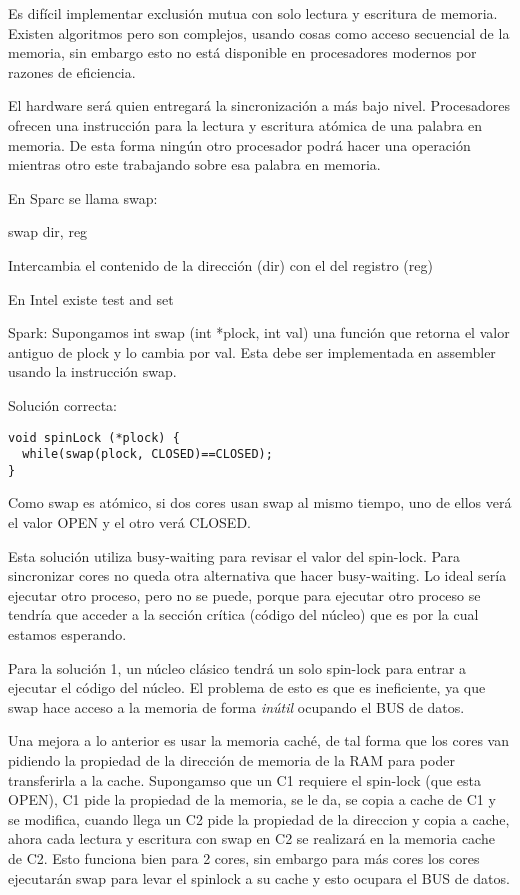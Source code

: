 Es difícil implementar exclusión mutua con solo lectura y escritura de memoria. Existen algoritmos pero son complejos, usando cosas como acceso secuencial de la memoria, sin embargo esto no está disponible en procesadores modernos por razones de eficiencia.

El hardware será quien entregará la sincronización a más bajo nivel. Procesadores ofrecen una instrucción para la lectura y escritura atómica de una palabra en memoria. De esta forma ningún otro procesador podrá hacer una operación mientras otro este trabajando sobre esa palabra en memoria.

En Sparc se llama swap:

swap dir, reg

Intercambia el contenido de la dirección (dir) con el del registro (reg)

En Intel existe test and set


Spark: Supongamos int swap (int *plock, int val) una función que retorna el valor antiguo de plock y lo cambia por val. Esta debe ser implementada en assembler usando la instrucción swap.

Solución correcta:
\begin{verbatim}
void spinLock (*plock) {
  while(swap(plock, CLOSED)==CLOSED);
}
\end{verbatim}

Como swap es atómico, si dos cores usan swap al mismo tiempo, uno de ellos verá el valor OPEN y el otro verá CLOSED.

Esta solución utiliza busy-waiting para revisar el valor del spin-lock. Para sincronizar cores no queda otra alternativa que hacer busy-waiting. Lo ideal sería ejecutar otro proceso, pero no se puede, porque para ejecutar otro proceso se tendría que acceder a la sección crítica (código del núcleo) que es por la cual estamos esperando.

Para la solución 1, un núcleo clásico tendrá un solo spin-lock para entrar a ejecutar el código del núcleo. El problema de esto es que es ineficiente, ya que swap hace acceso a la memoria de forma \textit{inútil} ocupando el BUS de datos.

Una mejora a lo anterior es usar la memoria caché, de tal forma que los cores van pidiendo la propiedad de la dirección de memoria de la RAM para poder transferirla a la cache. Supongamso que un C1 requiere el spin-lock (que esta OPEN), C1 pide la propiedad de la memoria, se le da, se copia a cache de C1 y se modifica, cuando llega un C2 pide la propiedad de la direccion y copia a cache, ahora cada lectura y escritura con swap en C2 se realizará en la memoria cache de C2. Esto funciona bien para 2 cores, sin embargo para más cores los cores ejecutarán swap para levar el spinlock a su cache y esto ocupara el BUS de datos.

